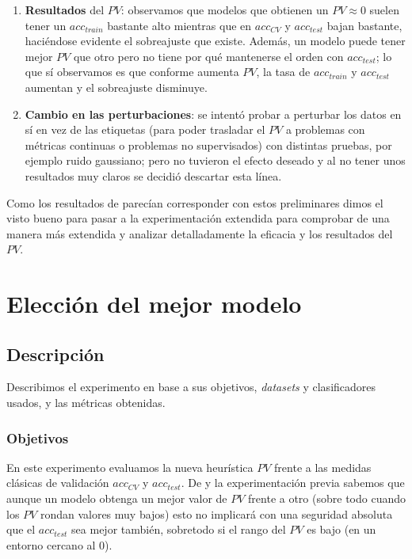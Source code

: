 \begin{enumerate}
  \item \textbf{Resultados} del $PV$: observamos que modelos que obtienen un $PV \approx 0$ suelen tener un $acc_{train}$ bastante alto mientras que en $acc_{CV}$ y $acc_{test}$ bajan bastante, haciéndose evidente el sobreajuste que existe. Además, un modelo puede tener mejor $PV$ que otro pero no tiene por qué mantenerse el orden con $acc_{test}$; lo que sí observamos es que conforme aumenta $PV$, la tasa de $acc_{train}$ y $acc_{test}$ aumentan y el sobreajuste disminuye.

  \item \textbf{Cambio en las perturbaciones}: se intentó probar a perturbar los datos en sí en vez de las etiquetas (para poder trasladar el $PV$ a problemas con métricas continuas o problemas no supervisados) con distintas pruebas, por ejemplo ruido gaussiano; pero no tuvieron el efecto deseado y al no tener unos resultados muy claros se decidió descartar esta línea.

\end{enumerate}

Como los resultados de \cite{zhang2019perturbation} parecían corresponder con estos preliminares dimos el visto bueno para pasar a la experimentación extendida para comprobar de una manera más extendida y analizar detalladamente la eficacia y los resultados del $PV$.

\section{Elección del mejor modelo}

\subsection{Descripción}

Describimos el experimento en base a sus objetivos, \emph{datasets} y clasificadores usados, y las métricas obtenidas.

\subsubsection{Objetivos}

En este experimento evaluamos la nueva heurística $PV$ frente a las medidas clásicas de validación $acc_{CV}$ y $acc_{test}$. De \cite{zhang2019perturbation} y la experimentación previa sabemos que aunque un modelo obtenga un mejor valor de $PV$ frente a otro (sobre todo cuando los $PV$ rondan valores muy bajos) esto no implicará con una seguridad absoluta que el $acc_{test}$ sea mejor también, sobretodo si el rango del $PV$ es bajo (en un entorno cercano al 0).

